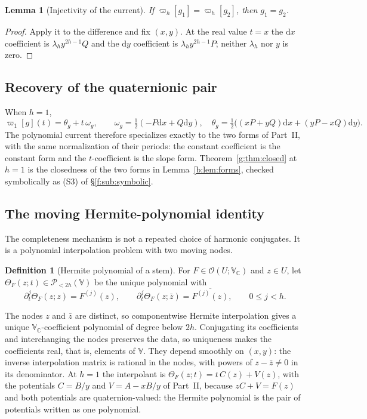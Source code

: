 \documentclass[11pt,a4paper]{article}
\numberwithin{equation}{section}
\newtheorem{lemma}[theorem]{Lemma}
\theoremstyle{definition}
\newtheorem{definition}[theorem]{Definition}
\theoremstyle{remark}
\theoremstyle{plain}
\newcommand{\CC}{\mathbb C}
\newcommand{\om}{\omega}
\newcommand{\thet}{\theta}
\newcommand{\pot}{C}          %
\newcommand{\potV}{V}         %
\newcommand{\dd}{\mathrm d}
\newcommand{\VV}{\mathbb V}                       %
\newcommand{\VC}{\mathbb V_{\CC}}                 %
\newcommand{\PolH}{\mathscr P_{<2h}(\VV)}
\newcommand{\cur}{\varpi}                         %
\newcommand{\Herm}{\Theta}                        %
\begin{document}
\begin{lemma}[Injectivity of the current]
\label{g:lem:current-injective}
If $\cur_h[g_1]=\cur_h[g_2]$, then $g_1=g_2$.
\end{lemma}

\begin{proof}
Apply it to the difference and fix $(x,y)$. At the real value $t=x$ the
$\dd x$ coefficient is $\lambda_hy^{2h-1}Q$ and the $\dd y$ coefficient is
$\lambda_hy^{2h-1}P$; neither $\lambda_h$ nor $y$ is zero.
\end{proof}

\subsection{Recovery of the quaternionic pair}
\label{g:sub:recovery}

When $h=1$,
\begin{equation}\label{g:eq:recovery}
 \cur_1[g](t)=\thet_g+t\,\om_g,\qquad
 \om_g=\tfrac12(-P\dd x+Q\dd y),\quad
 \thet_g=\tfrac12\bigl((xP+yQ)\dd x+(yP-xQ)\dd y\bigr).
\end{equation}
The polynomial current therefore specializes exactly to the two forms of
Part~II, with the same normalization of their periods: the constant
coefficient is the constant form and the $t$-coefficient is the slope form.
Theorem~\ref{g:thm:closed} at $h=1$ is the closedness of the two forms in
Lemma~\ref{b:lem:forms}, checked symbolically as (S3) of
\S\ref{f:sub:symbolic}.

\subsection{The moving Hermite-polynomial identity}
\label{g:sub:hermite}

The completeness mechanism is not a repeated choice of harmonic conjugates. It
is a polynomial interpolation problem with two moving nodes.

\begin{definition}[Hermite polynomial of a stem]
\label{g:def:hermite}
For $F\in\mathcal O(U;\VC)$ and $z\in U$, let $\Herm_F(z;t)\in\PolH$ be the
unique polynomial with
\begin{equation}\label{g:eq:hermite-jets}
 \partial_t^j\Herm_F(z;z)=F^{(j)}(z),\qquad
 \partial_t^j\Herm_F(z;\bar z)=\overline{F^{(j)}(z)},\qquad 0\le j<h.
\end{equation}
\end{definition}

The nodes $z$ and $\bar z$ are distinct, so componentwise Hermite interpolation
gives a unique $\VC$-coefficient polynomial of degree below $2h$. Conjugating
its coefficients and interchanging the nodes preserves the data, so uniqueness
makes the coefficients real, that is, elements of $\VV$. They depend smoothly
on $(x,y)$: the inverse interpolation matrix is rational in the nodes, with
powers of $z-\bar z\ne0$ in its denominator. At $h=1$ the interpolant is
$\Herm_F(z;t)=t\,\pot(z)+\potV(z)$, with the potentials $\pot=B/y$ and
$\potV=A-xB/y$ of Part~II, because $z\pot+\potV=F(z)$ and both potentials are
quaternion-valued: the Hermite polynomial is the pair of potentials written as
one polynomial.
\end{document}

